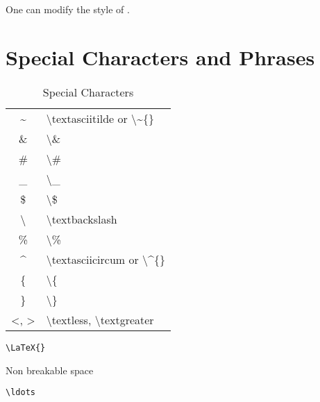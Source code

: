 \subsection{\TOC{}}
One can modify the style of \TOC{}.

\section{Special Characters and Phrases}
\begin{table}
    \centering
    \caption{Special Characters}
    \label{tab:spe_chars}
    \begin{tabular}{|cl|}
	\hline
	\textasciitilde	& \textbackslash{textasciitilde} or \textbackslash{\~{}\{\}}	\\
	\&  & \textbackslash{}\&    \\
	\#  & \textbackslash{}\#    \\
	\_  & \textbackslash{}\_    \\
	\$  & \textbackslash{}\$    \\
	\textbackslash{}    & \textbackslash{textbackslash} \\
	\%  & \textbackslash{}\%    \\
	\textasciicircum    & \textbackslash{textasciicircum} or \textbackslash{\^{}\{\}}  \\
	\{  & \textbackslash{}\{    \\
	\}  & \textbackslash{}\}    \\
	\hline
	\textless, \textgreater	& \textbackslash{textless}, \textbackslash{textgreater}	\\
	\hline
    \end{tabular}
\end{table}

\begin{description}[style=nextline]
    \item [\LaTeX{}]	\verb|\LaTeX{}| 
    \item [\~{}]	Non breakable space
    \item [\ldots]	\verb|\ldots|
\end{description}

